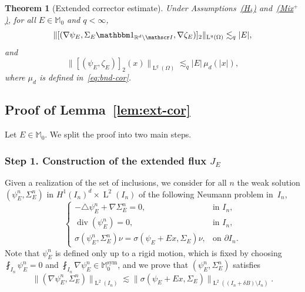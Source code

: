 \documentclass[10pt]{amsart}
\let\mathcal\mathscr
\newcommand{\Hd}{\hyperref[Hd]{\textup{(H$_\delta$)}}\xspace}
\newcommand{\Mix}{\hyperref[Mix+]{\textup{(Mix$^+$)}}\xspace}
\let\mathds\mathbbm
\theoremstyle{plain}
\newtheorem{theor}{Theorem}[section]
\theoremstyle{definition}
\newcommand{\R}{\mathbb R}
\newcommand{\Ic}{\mathcal I}
\newcommand{\Md}{\mathbb M}
\newcommand{\Ld}{\operatorname{L}}
\newcommand{\Div}{{\operatorname{div}}}
\newcommand{\Sym}{{\operatorname{sym}}}
\newcommand{\step}[1]{\subsubsection*{Step #1}}
\begin{document}
\begin{theor}[Extended corrector estimate]\label{th:cor+}
Under Assumptions~\Hd and~\Mix, for all $E\in\Md_0$ and $q<\infty$,
\begin{equation}\label{eq:bnd-grad-cor1}
\|[(\nabla\psi_E,\Sigma_E\mathds1_{\R^d\setminus\Ic},\nabla\zeta_E)]_2\|_{\Ld^q(\Omega)}\lesssim_q |E|,
\end{equation}
and
\begin{equation}\label{eq:bnd-cor1}
\|[(\psi_E,\zeta_E)]_2(x)\|_{\Ld^q(\Omega)}\lesssim_q |E|\,\mu_d(|x|),
\end{equation}
where $\mu_d$ is defined in~\eqref{eq:bnd-cor}.
\end{theor}

\subsection{Proof of Lemma~\ref{lem:ext-cor}}\label{sec:pr-ext-cor}
Let $E\in\Md_0$.
We split the proof into two main steps.

\step{1. Construction of the extended flux $J_E$}
Given a realization of the set of inclusions, we consider for all $n$ the weak solution $(\psi_E^n,\Sigma_E^n)$ in $H^1(I_n)^d\times\Ld^2(I_n)$ of the following Neumann problem in~$I_n$,
\begin{equation}\label{eq:sol-psiEn}
\begin{cases}
-\triangle\psi_E^{n}+\nabla\Sigma_E^{n}=0,&\text{in $I_n$},\\
\Div(\psi_E^{n})=0,&\text{in $I_n$},\\
\sigma(\psi_E^{n},\Sigma_E^{n})\nu=\sigma(\psi_E+Ex,\Sigma_E)\nu,&\text{on $\partial I_n$}.
\end{cases}
\end{equation}
Note that $\psi_E^{n}$ is defined only up to a rigid motion, which is fixed by choosing \hbox{$\fint_{I_n}\!\psi_E^{n}\!=\!0$} and $\fint_{I_n}\nabla\psi_E^{n}\in\Md^\Sym_0$, and we prove that $(\psi_E^n,\Sigma_E^n)$ satisfies
\begin{equation}\label{eq:bnd-psinSign}
\|(\nabla\psi_E^n,\Sigma_E^n)\|_{\Ld^2(I_n)} \lesssim \|\sigma(\psi_E+Ex,\Sigma_E)\|_{\Ld^2((I_n+\delta B)\setminus I_n)}.
\end{equation}
\end{document}
